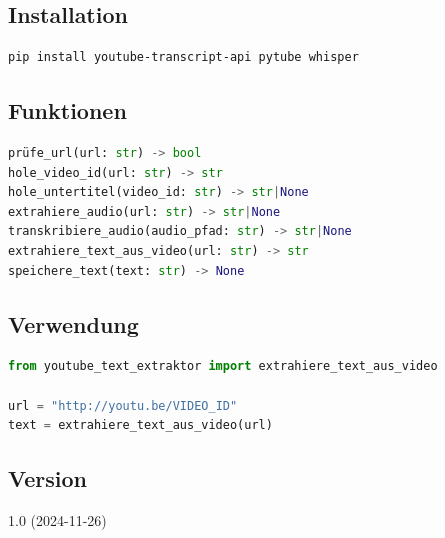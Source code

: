 \documentclass{vorlage-design-main}
\begin{document}
\subsection{Installation}\label{installation-4}

\begin{lstlisting}[language=bash]
pip install youtube-transcript-api pytube whisper
\end{lstlisting}

\subsection{Funktionen}\label{funktionen-1}

\begin{lstlisting}[language=Python]
prüfe_url(url: str) -> bool
hole_video_id(url: str) -> str
hole_untertitel(video_id: str) -> str|None
extrahiere_audio(url: str) -> str|None
transkribiere_audio(audio_pfad: str) -> str|None
extrahiere_text_aus_video(url: str) -> str
speichere_text(text: str) -> None
\end{lstlisting}

\subsection{Verwendung}\label{verwendung-6}

\begin{lstlisting}[language=Python]
from youtube_text_extraktor import extrahiere_text_aus_video

url = "http://youtu.be/VIDEO_ID"
text = extrahiere_text_aus_video(url)
\end{lstlisting}

\subsection{Version}\label{version-5}

1.0 (2024-11-26)


\clearpage
\printbibliography
\end{document}
